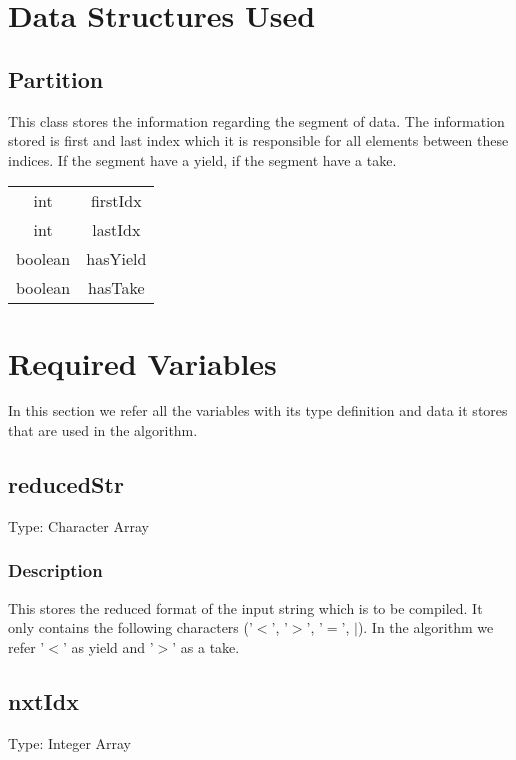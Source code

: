 \documentclass{article}
\begin{document}
 \begin{flushleft}

\section{Data Structures Used}

\subsection{Partition}

This class stores the information regarding the segment of data. The information stored is first and last index which it is responsible for all elements between these indices. If the segment have a yield, if the segment have a take. 
\BlankLine
  \begin{tabular}{ c c }
    int & firstIdx \\ 
    int & lastIdx \\
    boolean & hasYield \\
    boolean & hasTake \\
  \end{tabular}

\section{Required Variables}

In this section we refer all the variables with its type definition and 
data it stores that are used in the algorithm.

\subsection{reducedStr}

Type: Character Array

\subsubsection*{Description}
This stores the reduced format of the input string which is to be compiled.
It only contains the following characters ('$<$', '$>$', '$=$', $|$). In the algorithm we refer
'$<$' as yield and '$>$' as a take.

\subsection{nxtIdx}

Type: Integer Array


\end{flushleft}
\end{document}
